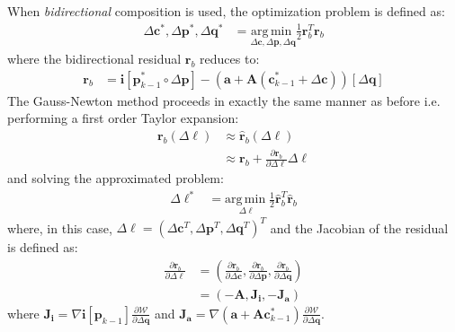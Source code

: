 When \emph{bidirectional} composition is used, the optimization problem is defined as:
\begin{equation}
    \begin{aligned}
        \Delta \mathbf{c}^*, \Delta \mathbf{p}^*, \Delta \mathbf{q}^*& = \underset{\Delta \mathbf{c}, \Delta \mathbf{p}, \Delta \mathbf{q}}{\mathrm{arg\,min\;}} \frac{1}{2} \mathbf{r}_b^T\mathbf{r}_b
    \label{eq:bidirectional_ssd}
    \end{aligned}
\end{equation}
where the bidirectional residual $\mathbf{r}_b$ reduces to:
\begin{equation}
    \begin{aligned}
		\mathbf{r}_b & = \mathbf{i}[\mathbf{p}_{k-1}^* \circ \Delta \mathbf{p}] - (\mathbf{a} + \mathbf{A}(\mathbf{c}^*_{k-1} + \Delta\mathbf{c})) [\Delta \mathbf{q}]
    \label{eq:bidirectional_residual}
    \end{aligned}
\end{equation}
The Gauss-Newton method proceeds in exactly the same manner as before i.e. performing a first order Taylor expansion:
\begin{equation}
    \begin{aligned}
		\mathbf{r}_b(\Delta \boldsymbol{\ell}) & \approx \hat{\mathbf{r}}_b(\Delta \boldsymbol{\ell})
		\\
		& \approx \mathbf{r}_b + \frac{\partial \mathbf{r}_b}{\partial \Delta \boldsymbol{\ell}} \Delta \boldsymbol{\ell}
    \label{eq:idirectional_residual_taylor}
    \end{aligned}
\end{equation}
and solving the approximated problem:
\begin{equation}
    \begin{aligned}
        \Delta \boldsymbol{\ell}^* & = \underset{\Delta \boldsymbol{\ell}}{\mathrm{arg\,min\;}} \frac{1}{2} \hat{\mathbf{r}}_b^T\hat{\mathbf{r}}_b
    \label{eq:bidirectional_ssd_taylor}
    \end{aligned}
\end{equation}
where, in this case, $\Delta \boldsymbol{\ell} = (\Delta \mathbf{c}^T, \Delta \mathbf{p}^T, \Delta \mathbf{q}^T)^T$ and the Jacobian of the residual is defined as:
\begin{equation}
    \begin{aligned}
		\frac{\partial \mathbf{r}_b}{\partial \Delta \boldsymbol{\ell}}& = \left( \frac{\partial \mathbf{r}_b}{\partial \Delta \mathbf{c}}, \frac{\partial \mathbf{r}_b}{\partial \Delta \mathbf{p}}, \frac{\partial \mathbf{r}_b}{\partial \Delta \mathbf{q}} \right)
		\\
		& = \left( -\mathbf{A}, \mathbf{J}_{\mathbf{i}}, -\mathbf{J}_{\mathbf{a}} \right)
    \label{eq:bidirectional_jacobian}
    \end{aligned}
\end{equation}
where $\mathbf{J}_\mathbf{i} = \nabla \mathbf{i}[\mathbf{p}_{k-1}] \frac{\partial \mathcal{W}}{\partial \Delta \mathbf{q}}$ and $\mathbf{J}_\mathbf{a} = \nabla (\mathbf{a} + \mathbf{A}\mathbf{c}_{k-1}^*) \frac{\partial \mathcal{W}}{\partial \Delta \mathbf{q}}.$


